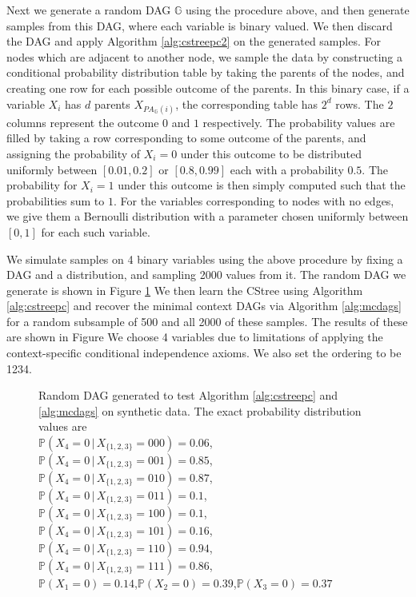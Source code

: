 \documentclass{tufte-book}
\begin{document}
Next we generate a random DAG \(\mathbb{G}\) using the procedure above, and then generate samples from this DAG, where each variable is binary valued. We then discard the DAG and apply Algorithm \ref{alg:cstreepc2} on the generated samples. For nodes which are adjacent to another node, we sample the data by constructing a conditional probability distribution table by taking the parents of the nodes, and creating one row for each possible outcome of the parents. In this binary case, if a variable \(X_i\) has \(d\) parents \(X_{PA_{\mathbb{G}}(i)}\), the corresponding table has \(2^d\) rows. The \(2\) columns represent the outcome \(0\) and \(1\) respectively. The probability values are filled by taking a row corresponding to some outcome of the parents, and assigning the probability of \(X_i=0\) under this outcome to be distributed uniformly between \([0.01,0.2]\) or \([0.8,0.99]\) each with a probability \(0.5\). The probability for \(X_i=1\) under this outcome is then simply computed such that the probabilities sum to \(1\). For the variables corresponding to nodes with no edges, we give them a Bernoulli distribution with a parameter chosen uniformly between \([0,1]\) for each such variable.



We simulate samples on 4 binary variables using the above procedure by fixing a DAG and a distribution, and sampling 2000 values from it. The random DAG we generate is shown in Figure \ref{fig:syntheticdag} We then learn the CStree using Algorithm \ref{alg:cstreepc} and recover the minimal context DAGs via Algorithm \ref{alg:mcdags} for a random subsample of 500 and all 2000 of these samples. The results of these are shown in Figure  We choose 4 variables due to limitations of applying the context-specific conditional independence axioms. We also set the ordering to be 1234.

\begin{figure}[]\label{fig:syntheticdag}
 \centering
{}%
\caption{Random DAG generated to test Algorithm \ref{alg:cstreepc} and \ref{alg:mcdags} on synthetic data. The exact probability distribution values are\\ $\mathbb{P}(X_4=0\,|\,X_{\{1,2,3\}}=000)=0.06$,\\ $\mathbb{P}(X_4=0\,|\,X_{\{1,2,3\}}=001)=0.85$,\\
$\mathbb{P}(X_4=0\,|\,X_{\{1,2,3\}}=010)=0.87$,\\ $\mathbb{P}(X_4=0\,|\,X_{\{1,2,3\}}=011)=0.1$,\\
$\mathbb{P}(X_4=0\,|\,X_{\{1,2,3\}}=100)=0.1$,\\ $\mathbb{P}(X_4=0\,|\,X_{\{1,2,3\}}=101)=0.16$,\\
$\mathbb{P}(X_4=0\,|\,X_{\{1,2,3\}}=110)=0.94$,\\
$\mathbb{P}(X_4=0\,|\,X_{\{1,2,3\}}=111)=0.86$,\\
$\mathbb{P}(X_1=0)=0.14$,$\mathbb{P}(X_2=0)=0.39$,$\mathbb{P}(X_3=0)=0.37$}

\end{figure}
\end{document}
